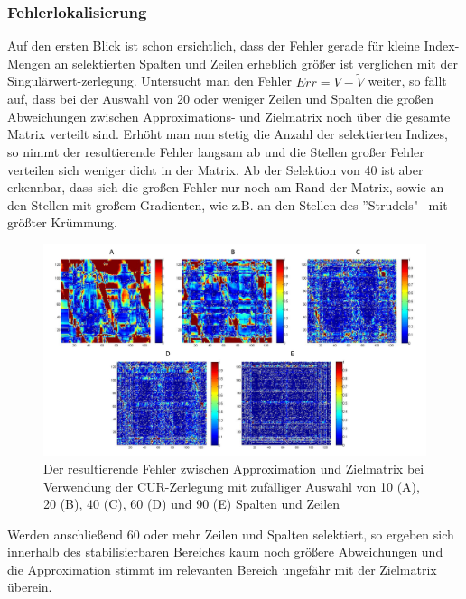 \documentclass[12pt,a4paper,twoside]{article}
\begin{document}
\subsubsection*{Fehlerlokalisierung}
Auf den ersten Blick ist schon ersichtlich, dass der Fehler gerade für kleine Index-Mengen an selektierten Spalten und Zeilen erheblich größer ist verglichen mit der Singulärwert-zerlegung.
Untersucht man den Fehler $Err = V - \tilde{V}$ weiter, so fällt auf, dass bei der Auswahl von 20 oder weniger Zeilen und Spalten die großen Abweichungen zwischen Approximations- und Zielmatrix noch über die gesamte Matrix verteilt sind. Erhöht man nun stetig die Anzahl der selektierten Indizes, so nimmt der resultierende Fehler langsam ab und die Stellen großer Fehler verteilen sich weniger dicht in der Matrix. Ab der Selektion von 40 ist aber erkennbar, dass sich die großen Fehler nur noch am Rand der Matrix, sowie an den Stellen mit großem Gradienten, wie z.B. an den Stellen des ''Strudels" \ mit größter Krümmung.
\begin{figure}[h]
\center
	\includegraphics[scale=0.4]{randCUR_fehler}
	\caption{Der resultierende Fehler zwischen Approximation und Zielmatrix bei Verwendung der CUR-Zerlegung mit zufälliger Auswahl von 10 (A), 20 (B), 40 (C), 60 (D) und 90 (E) Spalten und Zeilen}
\end{figure}
Werden anschließend 60 oder mehr Zeilen und Spalten selektiert, so ergeben sich innerhalb des stabilisierbaren Bereiches kaum noch größere Abweichungen und die Approximation stimmt im relevanten Bereich ungefähr mit der Zielmatrix überein.
\newpage
\end{document}
